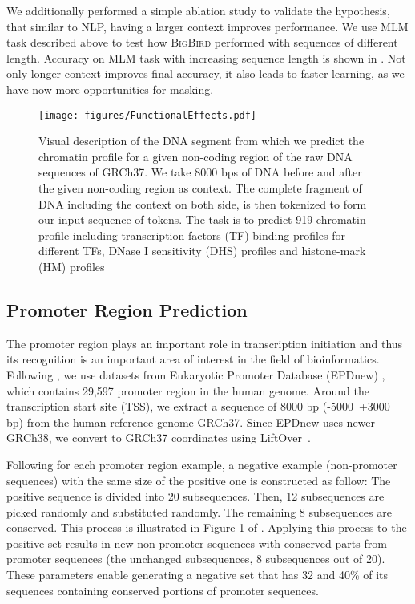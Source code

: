 \documentclass{article}
\newcommand{\bigb}{\textsc{BigBird}\xspace}
\begin{document}
We additionally performed a simple ablation study to validate the hypothesis, that similar to NLP, having a larger context improves performance. 
We use MLM task described above to test how \bigb performed with sequences of different length. 
Accuracy on MLM task with increasing sequence length is shown in . 
Not only longer context improves final accuracy, it also leads to faster learning, as we have now more opportunities for masking.

\begin{figure}
\vspace{-5mm}
    \centering
    \texttt{[image: figures/FunctionalEffects.pdf]}
    \caption{Visual description of the DNA segment from which we predict the chromatin profile for a given non-coding region of the raw DNA sequences of GRCh37. We take 8000 bps of DNA before and after the given non-coding region as context. The complete fragment of DNA including the context on both side, is then tokenized to form our input sequence of tokens. The task is to predict  919  chromatin profile including  transcription factors (TF) binding profiles for  different TFs,  DNase I sensitivity (DHS) profiles and  histone-mark (HM) profiles}
    \label{fig:apndx_fep_data}
\end{figure}

\subsection{Promoter Region Prediction}
The promoter region plays an important role in transcription initiation and thus its recognition is an important area of interest in the field of bioinformatics.
Following \citet{oubounyt2019deepromoter}, we use datasets from Eukaryotic Promoter Database (EPDnew) \citep{dreos2013epd}, which contains
29,597 promoter region in the human genome.
Around the transcription start site (TSS), we extract a sequence of 8000 bp (-5000~+3000 bp) from the human reference genome GRCh37.
Since EPDnew uses newer GRCh38, we convert to GRCh37 coordinates using LiftOver~\citep{kent2002human}.

Following \citet{oubounyt2019deepromoter} for each promoter region example, a negative example (non-promoter sequences) with the same size of the positive one is constructed as follow:
The positive sequence is divided into 20 subsequences. Then, 12 subsequences are picked randomly and substituted randomly. The remaining 8 subsequences are conserved. This process is illustrated in Figure 1 of \citep{oubounyt2019deepromoter}. Applying this process to the positive set results in new non-promoter sequences with conserved parts from promoter sequences (the unchanged subsequences, 8 subsequences out of 20). These parameters enable generating a negative set that has 32 and 40\% of its sequences containing conserved portions of promoter sequences.
\end{document}
